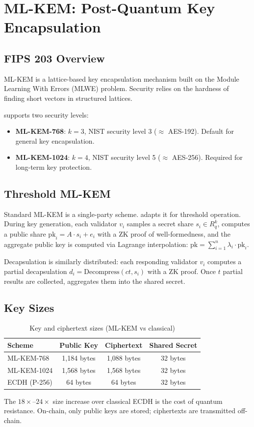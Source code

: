 \section{ML-KEM: Post-Quantum Key Encapsulation}


\subsection{FIPS 203 Overview}

ML-KEM is a lattice-based key encapsulation mechanism built on the Module Learning With Errors (MLWE) problem. Security relies on the hardness of finding short vectors in structured lattices.

\begin{definition}
\KChain{} supports two security levels:
\begin{itemize}
\item \textbf{ML-KEM-768}: $k=3$, NIST security level 3 ($\approx$ AES-192). Default for general key encapsulation.
\item \textbf{ML-KEM-1024}: $k=4$, NIST security level 5 ($\approx$ AES-256). Required for long-term key protection.
\end{itemize}
\end{definition}

\subsection{Threshold ML-KEM}

Standard ML-KEM is a single-party scheme. \KChain{} adapts it for threshold operation. During key generation, each validator $v_i$ samples a secret share $s_i \in R_q^k$, computes a public share $\text{pk}_i = A \cdot s_i + e_i$ with a ZK proof of well-formedness, and the aggregate public key is computed via Lagrange interpolation: $\text{pk} = \sum_{i=1}^{n} \lambda_i \cdot \text{pk}_i$.

Decapsulation is similarly distributed: each responding validator $v_i$ computes a partial decapsulation $d_i = \text{Decompress}(ct, s_i)$ with a ZK proof. Once $t$ partial results are collected, \KeyVM{} aggregates them into the shared secret.

\subsection{Key Sizes}

\begin{table}[h]
\centering
\begin{tabular}{lccc}
\toprule
\textbf{Scheme} & \textbf{Public Key} & \textbf{Ciphertext} & \textbf{Shared Secret} \\
\midrule
ML-KEM-768 & 1,184 bytes & 1,088 bytes & 32 bytes \\
ML-KEM-1024 & 1,568 bytes & 1,568 bytes & 32 bytes \\
ECDH (P-256) & 64 bytes & 64 bytes & 32 bytes \\
\bottomrule
\end{tabular}
\caption{Key and ciphertext sizes (ML-KEM vs classical)}
\label{tab:kem-sizes}
\end{table}

The $18\times$--$24\times$ size increase over classical ECDH is the cost of quantum resistance. On-chain, only public keys are stored; ciphertexts are transmitted off-chain.

